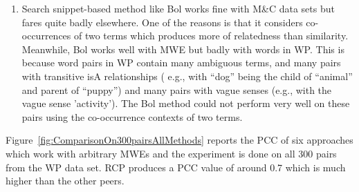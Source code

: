 \begin{enumerate}
\item  Search snippet-based method like Bol works fine with M\&C data sets
but fares quite badly elsewhere. One of the reasons is that it considers
co-occurrences of two terms which produces more of relatedness than
similarity. Meanwhile, Bol works well with
MWE but badly with words in WP. This is because word pairs in WP contain many ambiguous terms, and many pairs with transitive isA relationships ( e.g.,  with ``dog'' being the child of ``animal'' and parent of ``puppy'') and many pairs with vague senses (e.g.,  with the vague sense 'activity'). The Bol method could not perform very well on these pairs using the co-occurrence contexts of two terms. %
\end{enumerate}

Figure~\ref{fig:ComparisonOn300pairsAllMethods} reports
the PCC of six approaches which work with arbitrary MWEs and the
experiment is done on all 300 pairs from the WP data set.
RCP produces a PCC value of around 0.7 which is much higher
than the other peers.

